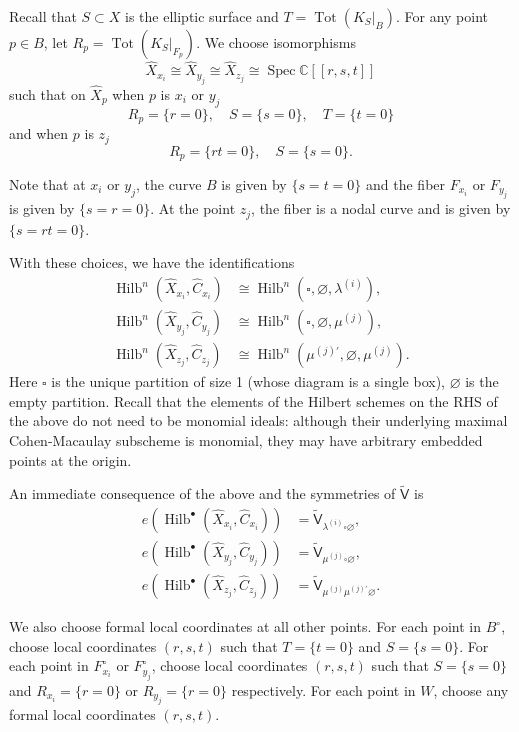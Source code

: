 \documentclass[12pt]{amsart}
\theoremstyle{definition}
\newcommand{\CC} {\mathbb{C}}          %
\newcommand{\sfVtilde}{\widetilde{\mathsf{V}}}
\newcommand{\Hilb}{\operatorname{Hilb}}
\newcommand{\Tot}{\operatorname{Tot}}
\newcommand{\Spec}{\operatorname{Spec}}
\renewcommand{\emptyset}{\varnothing}
\renewcommand{\hat}{\widehat}
\newcommand{\Xhat}{\widehat{X}}
\newcommand{\bx}{\square}
\newcommand{\mujprime}{\mu^{(j)\prime}}
\begin{document}
Recall that $S\subset X$ is the elliptic surface and $T=\Tot
(K_{S}|_{B}).$ For any point $p\in B$, let $R_{p} =\Tot
(K_{S}|_{F_{p}})$. We choose isomorphisms 
\[
\Xhat_{x_{i}} \cong \Xhat_{y_{j}} \cong \Xhat_{z_{j}} \cong \Spec \CC [[r,s,t]]
\]
such that on $\Xhat_{p}$ when $p$ is $x_{i}$ or $y_{j}$
\[
R_{p} = \{r=0 \},\quad S=\{s=0 \}, \quad T=\{t=0 \}
\]
and when $p$ is $z_{j}$ 
\[
R_{p}=\{rt=0 \}, \quad S=\{s=0 \}.
\]

Note that at $x_{i}$ or $y_{j}$, the curve $B$ is given by $\{s=t=0
\}$ and the fiber $F_{x_{i}}$ or $F_{y_{j}}$ is given by $\{s=r=0
\}$. At the point $z_{j}$, the fiber is a nodal curve and is given by
$\{s=rt=0 \}$.

With these choices, we have the identifications
\begin{align*}
\Hilb^{n}\left(\Xhat_{x_{i}},\hat{C}_{x_{i}} \right)&\cong
\Hilb^{n}\left(\bx ,\emptyset ,\lambda^{(i)} \right),\\
\Hilb^{n}\left(\Xhat_{y_{j}},\hat{C}_{y_{j}} \right)&\cong
\Hilb^{n}\left(\bx ,\emptyset ,\mu^{(j)} \right),\\
\Hilb^{n}\left(\Xhat_{z_{j}},\hat{C}_{z_{j}} \right)&\cong
\Hilb^{n}\left(\mujprime ,\emptyset ,\mu^{(j)} \right).
\end{align*}
Here $\bx$ is the unique partition of size 1 (whose diagram is a
single box), $\emptyset$ is the empty partition. Recall that the
elements of the Hilbert schemes on the RHS of the above do not need to
be monomial ideals: although their underlying maximal Cohen-Macaulay
subscheme is monomial, they may have arbitrary embedded points at the
origin.

An immediate consequence of the above and the symmetries of
$\sfVtilde$ is 
\begin{align}\label{eqn: e(Hilb(Xhat,Chat)=vertex}
e\left(\Hilb^{\bullet}\left(\Xhat_{x_{i}},\hat{C}_{x_{i}} \right) \right)&=
\sfVtilde_{\lambda^{(i)} \bx  \emptyset }, \\
e\left(\Hilb^{\bullet}\left(\Xhat_{y_{j}},\hat{C}_{y_{j}} \right) \right)&=
\sfVtilde_{ \mu^{(j)} \bx \emptyset }, \nonumber \\
e\left(\Hilb^{\bullet}\left(\Xhat_{z_{j}},\hat{C}_{z_{j}} \right) \right)&=
\sfVtilde_{\mu^{(j)} \mujprime \emptyset  }. \nonumber
\end{align}




We also choose formal local coordinates at all other points. For each
point in $B^{\circ}$, choose local coordinates $(r,s,t)$ such that
$T=\{t=0 \}$ and $S=\{s=0 \}$. For each point in $F^{\circ}_{x_{i}}$
or $F^{\circ}_{y_{j}}$, choose local coordinates $(r,s,t)$ such that
$S=\{s=0 \}$ and $R_{x_{i}}=\{r=0 \}$ or $R_{y_{j}}=\{r=0 \}$
respectively. For each point in $W$, choose any formal local
coordinates $(r,s,t)$.
\end{document}
